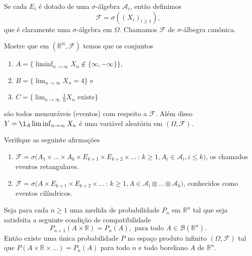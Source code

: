 Se cada $E_i$ é dotado de uma $\sigma$-álgebra $\mathcal{A}_i$, então definimos
\begin{equation}
  \mathcal{F} = \sigma( (X_i)_{i\geq 1} ),
\end{equation}
que é claramente uma $\sigma$-álgebra em $\Omega$.
Chamamos $\mathcal{F}$ de $\sigma$-álbegra canônica.

\begin{exercise}
  Mostre que em $(\mathbb{R}^{\mathbb{N}},\mathcal{F})$ temos que os conjuntos
  \begin{enumerate}[\quad a)]
  \item $A = \{ \liminf_{n\to \infty} X_n \notin \{\infty,-\infty\} \}$,
  \item $B = \{ \lim_{n\to \infty} X_n = 4\}$ e
  \item $C = \{ \lim_{n\to \infty} \tfrac{1}{n} X_n \text{ existe}\}$
  \end{enumerate}
  são todos mensuráveis (eventos) com respeito a $\mathcal{F}$.
  Além disso $Y = \1_A \liminf_{n\to \infty} X_n$ é uma variável aleatória em $(\Omega, \mathcal{F})$.
\end{exercise}

\begin{exercise}
  Verifique as seguinte afirmações
  \begin{enumerate}[\quad a)]
  \item $\mathcal{F} = \sigma\big(A_1 \times \dots \times A_k \times E_{k+1} \times E_{k+2} \times \dots\, : \, k \geq 1, A_i \in \mathcal{A}_i, i \leq k\big)$,
  os chamados eventos retangulares.
  \item $\mathcal{F} = \sigma\big(A \times E_{k+1} \times E_{k+2} \times \dots\, : \, k \geq 1, A \in \mathcal{A}_i \otimes \dots \otimes \mathcal{A}_k\big)$,
  conhecidos como eventos cilíndricos.
  \end{enumerate}
\end{exercise}

\begin{theorem}
  \label{t:extens_kolmog}
  Seja para cada $n \geq 1$ uma medida de probabilidade $P_n$ em $\mathbb{R}^n$ tal que seja satisfeita a seguinte condição de compatibilidade 
  \begin{equation}
    \label{e:consist_kolmog}
    P_{n+1} (A \times \mathbb{R}) = P_n (A), \text{ para todo $A \in \mathcal{B}(\mathbb{R}^n)$}.
  \end{equation}
  Então existe uma única probabilidade $P$ no espaço produto infinito $(\Omega, \mathcal{F})$ tal que $P(A \times \mathbb{R} \times \dots) = P_n (A)$ para todo $n$ e todo boreliano $A$ de $\mathbb{R}^n$.
\end{theorem}

